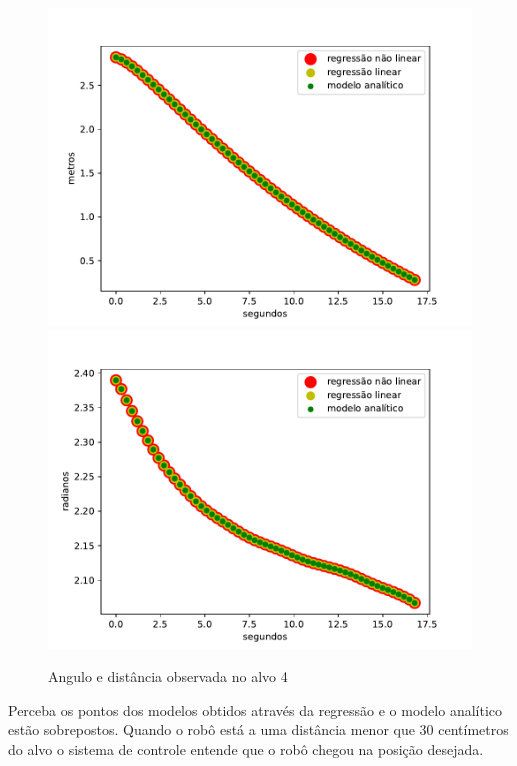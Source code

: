 \begin{figure}[H]
    \centering
    \includegraphics[scale=0.45]{figuras/distance_over_time_4.pdf}
    \includegraphics[scale=0.45]{figuras/angle_over_time_4.pdf}
    \caption{Angulo e distância observada no alvo 4}
\end{figure}

Perceba os pontos dos modelos obtidos através da regressão e o modelo analítico
estão sobrepostos. Quando o robô está a uma distância menor que 30 centímetros
do alvo o sistema de controle entende que o robô chegou na posição desejada.

